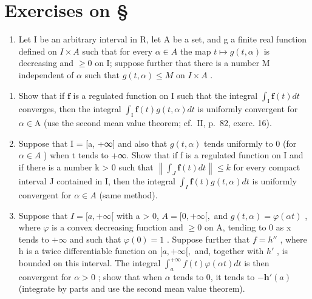 \setcounter{exercisegroup}{2}
\section*{Exercises on \S{}}
{}

\begin{enumerate}
\def\labelenumi{\arabic{enumi})}
\tightlist
\item
  Let I be an arbitrary interval in R, let A be a set, and g a finite real function defined on \(I \times A\) such that for every \(\alpha \in A\) the map \(t \mapsto g(t, \alpha)\) is decreasing and \(\geqslant 0\) on I; suppose further that there is a number M independent of \(\alpha\) such that \(g(t, \alpha) \leqslant M\) on \(I \times A\) .
\end{enumerate}

\begin{enumerate}
\def\labelenumi{\alph{enumi})}
\item
  Show that if \(\mathbf{f}\) is a regulated function on I such that the integral \(\int_{\mathrm{I}} \mathbf{f}(t) dt\) converges, then the integral \(\int_{\mathrm{I}} \mathbf{f}(t) g(t, \alpha) dt\) is uniformly convergent for \(\alpha \in \mathrm{A}\) (use the second mean value theorem; cf.~II, p.~82, exerc. 16).
\item
  Suppose that I = {[}a, +∞{]} and also that \(g(t, \alpha)\) tends uniformly to 0 (for \(\alpha \in A\) ) when t tends to +∞. Show that if f is a regulated function on I and if there is a number k \textgreater{} 0 such that \(\left\|\int_{J} \mathbf{f}(t) dt\right\| \leqslant k\) for every compact interval J contained in I, then the integral \(\int_{I} \mathbf{f}(t) g(t, \alpha) dt\) is uniformly convergent for \(\alpha \in A\) (same method).
\item
  Suppose that \(I = [a, +\infty[\) with a \textgreater{} 0, \(A = [0, +\infty[,\) and \(g(t, \alpha) = \varphi(\alpha t)\) , where \(\varphi\) is a convex decreasing function and \(\geqslant 0\) on A, tending to 0 as x tends to \(+\infty\) and such that \(\varphi(0) = 1\) . Suppose further that \(f = h''\) , where h is a twice differentiable function on \([a, +\infty[,\) and, together with \(h'\) , is bounded on this interval. The integral \(\int_{a}^{+\infty} f(t) \varphi(\alpha t) dt\) is then convergent for \(\alpha > 0\) ; show that when \(\alpha\) tends to 0, it tends to \(-\mathbf{h}'(a)\) (integrate by parts and use the second mean value theorem).
\end{enumerate}

